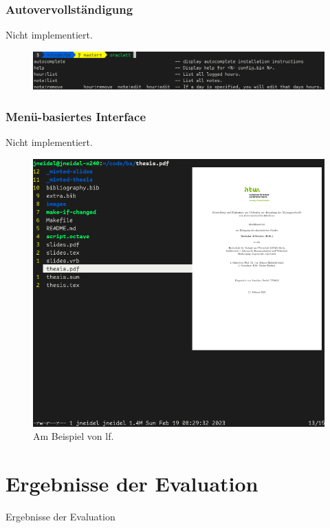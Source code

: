 \documentclass{beamer}
\begin{document}
\begin{frame}
  \frametitle{Autovervollständigung}

  Nicht implementiert.

  \begin{figure}[H]
    \centering
    \includegraphics[scale=0.31]{apps-autocomplete.png}
  \end{figure}
\end{frame}

\begin{frame}
  \frametitle{Menü-basiertes Interface}

  Nicht implementiert.

  \begin{figure}[H]
    \centering
    \includegraphics[scale=0.22]{demo-lf-menu.png}
    \caption{Am Beispiel von lf.}
  \end{figure}
\end{frame}

\section{Ergebnisse der Evaluation}
\begin{frame}
  \begin{center}
    {\Huge Ergebnisse der Evaluation}
  \end{center}
\end{frame}
\end{document}

